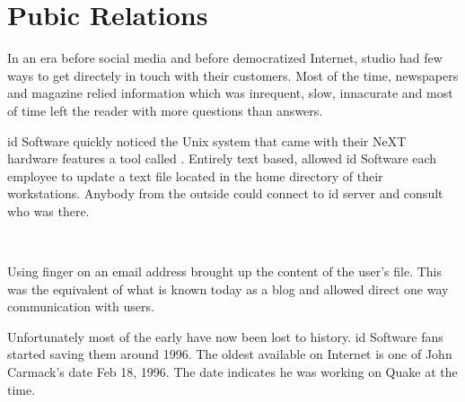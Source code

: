 \section{Pubic Relations}
In an era before social media and before democratized Internet, studio had few ways to get directely in touch with their customers. Most of the time, newspapers and magazine relied information which was inrequent, slow, innacurate and most of time left the reader with more questions than answers.\\
\par
id Software quickly noticed the Unix system that came with their NeXT hardware features a tool called . Entirely text based,  allowed id Software each employee to update a  text file located in the home directory of their workstations. Anybody from the outside could connect to id server and consult who was there.\\
\par
{}
\par
{}\\
\par

Using finger on an email address brought up the content of the user's  file. This was the equivalent of what is known today as a blog and allowed direct one way communication with users.\\
\par
Unfortunately most of the early  have now been lost to history. id Software fans started saving them around 1996. The oldest available on Internet is one of John Carmack's date Feb 18, 1996. The date indicates he was working on Quake at the time.\\
\par
{}



